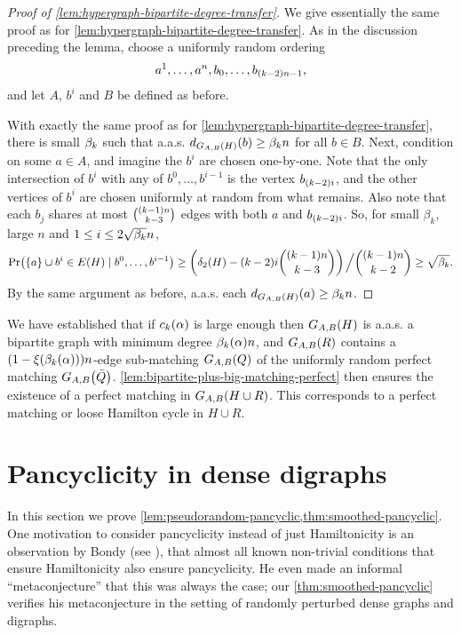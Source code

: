 \documentclass[11pt,english]{article}
\theoremstyle{plain}
\theoremstyle{definition}
\theoremstyle{definition}
\theoremstyle{plain}
\theoremstyle{plain}
\theoremstyle{plain}
\theoremstyle{plain}
\theoremstyle{remark}
\theoremstyle{remark}
\let\originalleft\left
\let\originalright\right
\renewcommand{\left}{\mathopen{}\mathclose\bgroup\originalleft}
\renewcommand{\right}{\aftergroup\egroup\originalright}
\begin{document}
\begin{proof}
[Proof of \ref{lem:hypergraph-bipartite-degree-transfer}]We give
essentially the same proof as for \ref{lem:hypergraph-bipartite-degree-transfer}. As in the discussion preceding the lemma, choose a uniformly random ordering
\[
a^{1},\dots,a^{n},b_{0},\dots,b_{\left(k-2\right)n-1},
\]
and let $A$, $b^i$ and $B$ be defined as before.

With exactly the same proof as for \ref{lem:hypergraph-bipartite-degree-transfer},
there is small $\beta_k$ such that a.a.s. $d_{G_{A,B}\left(H\right)}\left(b\right)\ge\aham n$
for all $b\in B$. Next, condition on some $a\in A$, and imagine the $b^i$ are chosen one-by-one. Note  that the only intersection of $b^i$ with any of $b^0,\dots,b^{i-1}$ is the vertex $b_{\left(k-2\right)i}$, and the other vertices of $b^i$ are chosen uniformly at random from what remains. Also note that each $b_j$ shares at most ${\left(k-1\right)n \choose k-3}$ edges with both $a$ and $b_{\left(k-2\right)i}$. So, for small $\beta_k$, large $n$
and $1\le i\le2\sqrt{\beta_k}n$,
\[
\Pr\left(\left\{ a\right\} \cup b^{i}\in E\left(H\right)\mid b^{0},\dots,b^{i-1}\right)\ge\left(\delta_{2}\left(H\right)-\left(k-2\right)i{\left(k-1\right)n \choose k-3}\right)\left.\vphantom{\sum}\right/{ \left(k-1\right)n \choose k-2}\ge\sqrt{\aham}.
\]
By the same argument as before, a.a.s. each $d_{G_{A,B}\left(H\right)}\left(a\right)\ge\aham n$.
\end{proof}
We have established that if $\chyp\left(\alpha\right)$ 
is large enough then $G_{A,B}\left(H\right)$ is a.a.s. a bipartite graph with minimum degree $\a\left(\alpha\right)n$, and $G_{A,B}\left(R\right)$ contains a $\left(1-\xi\left(\a\left(\alpha\right)\right)\right)n$-edge sub-matching $G_{A,B}\left(Q\right)$ of the uniformly random perfect matching $G_{A,B}\left(\bar{Q}\right)$. \ref{lem:bipartite-plus-big-matching-perfect} then
ensures the existence of a perfect matching in $G_{A,B}\left(H\cup R\right)$. This corresponds to a perfect matching or loose Hamilton cycle in $H\cup R$.


\section{\label{sec:digraphs}Pancyclicity in dense digraphs}

In this section we prove \ref{lem:pseudorandom-pancyclic,thm:smoothed-pancyclic}. One motivation to consider pancyclicity instead of just Hamiltonicity is an observation by Bondy (see \cite{Bon75}),
that almost all known non-trivial conditions that ensure Hamiltonicity
also ensure pancyclicity. He even made an informal ``metaconjecture''
that this was always the case; our \ref{thm:smoothed-pancyclic} verifies
his metaconjecture in the setting of randomly perturbed dense graphs
and digraphs.
\end{document}
